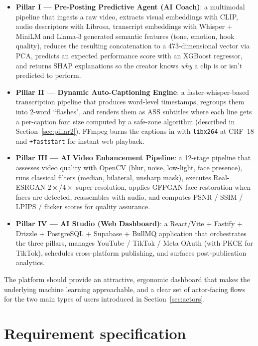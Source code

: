 \begin{itemize}
  \item \textbf{Pillar I --- Pre-Posting Predictive Agent (AI Coach)}: a multimodal pipeline
        that ingests a raw video, extracts visual embeddings with CLIP, audio descriptors
        with Librosa, transcript embeddings with Whisper + MiniLM and Llama-3 generated
        semantic features (tone, emotion, hook quality), reduces the resulting concatenation
        to a 473-dimensional vector via PCA, predicts an expected performance score with an
        XGBoost regressor, and returns SHAP explanations so the creator knows \emph{why} a
        clip is or isn't predicted to perform.
  \item \textbf{Pillar II --- Dynamic Auto-Captioning Engine}: a faster-whisper-based
        transcription pipeline that produces word-level timestamps, regroups them into
        2-word ``flashes", and renders them as ASS subtitles where each line gets a
        per-caption font size computed by a safe-zone algorithm (described in
        Section~\ref{sec:pillar2}). FFmpeg burns the captions in with \texttt{libx264} at
        CRF~18 and \texttt{+faststart} for instant web playback.
  \item \textbf{Pillar III --- AI Video Enhancement Pipeline}: a 12-stage pipeline that
        assesses video quality with OpenCV (blur, noise, low-light, face presence), runs
        classical filters (median, bilateral, unsharp mask), executes Real-ESRGAN
        $2\times$/$4\times$ super-resolution, applies GFPGAN face restoration when faces are
        detected, reassembles with audio, and computes PSNR / SSIM / LPIPS / flicker scores
        for quality assurance.
  \item \textbf{Pillar IV --- AI Studio (Web Dashboard)}: a React/Vite + Fastify + Drizzle +
        PostgreSQL + Supabase + BullMQ application that orchestrates the three pillars,
        manages YouTube / TikTok / Meta OAuth (with PKCE for TikTok), schedules cross-platform
        publishing, and surfaces post-publication analytics.
\end{itemize}

The platform should provide an attractive, ergonomic dashboard that makes the underlying
machine learning approachable, and a clear set of actor-facing flows for the two main types
of users introduced in Section~\ref{sec:actors}.

\section{Requirement specification}
\label{sec:requirements}


